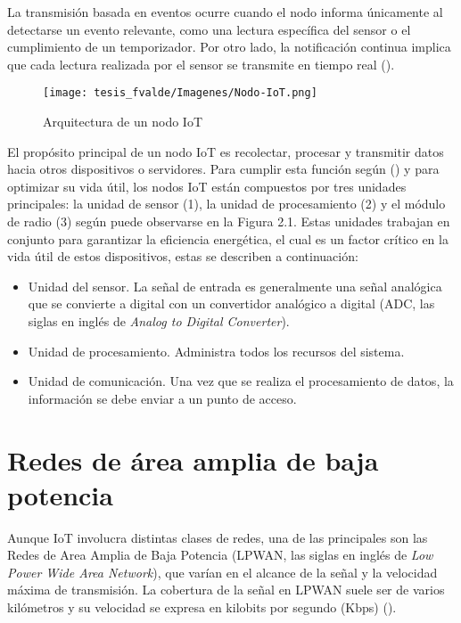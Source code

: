 \vspace{0.5cm}

La transmisión basada en eventos ocurre cuando el nodo informa únicamente al detectarse un evento relevante, como una lectura específica del sensor o el cumplimiento de un temporizador. Por otro lado, la notificación continua implica que cada lectura realizada por el sensor se transmite en tiempo real (\cite{caldas2020}).

\begin{figure}
    \centering
    \texttt{[image: tesis\_fvalde/Imagenes/Nodo-IoT.png]}
    \caption{Arquitectura de un nodo IoT}
    \label{fig:nodo_iot}
\end{figure}

\vspace{0.5cm}

El propósito principal de un nodo IoT es recolectar, procesar y transmitir datos hacia otros dispositivos o servidores. Para cumplir esta función según (\cite{bouguera2018}) y para optimizar su vida útil, los nodos IoT están compuestos por tres unidades principales: la unidad de sensor (1), la unidad de procesamiento (2) y el módulo de radio (3) según puede observarse en la Figura 2.1. Estas unidades trabajan en conjunto para garantizar la eficiencia energética, el cual es un factor crítico en la vida útil de estos dispositivos, estas se describen a continuación:


\begin{itemize}
   \item Unidad del sensor. La señal de entrada es generalmente una señal analógica que se convierte a digital con un convertidor analógico a digital (ADC, las siglas en inglés de \textit{Analog to Digital Converter}).
   \item Unidad de procesamiento. Administra todos los recursos del sistema.
   \item Unidad de comunicación. Una vez que se realiza el procesamiento de datos, la información se debe enviar a un punto de acceso.
\end{itemize}

\section{Redes de área amplia de baja potencia}

Aunque IoT involucra distintas clases de redes, una de las principales son las Redes de Area Amplia de Baja Potencia (LPWAN, las siglas en inglés de \textit{Low Power Wide Area Network}), que varían en el alcance de la señal y la velocidad máxima de transmisión. La cobertura de la señal en LPWAN suele ser de varios kilómetros y su velocidad se expresa en kilobits por segundo (Kbps) (\cite{Herrero2023}). 

